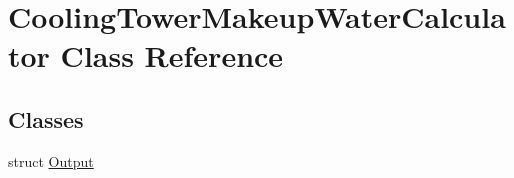 \hypertarget{class_cooling_tower_makeup_water_calculator}{}\section{Cooling\+Tower\+Makeup\+Water\+Calculator Class Reference}
\label{class_cooling_tower_makeup_water_calculator}
\subsection*{Classes}
\begin{DoxyCompactItemize}
\item 
struct \hyperlink{struct_cooling_tower_makeup_water_calculator_1_1_output}{Output}
\end{DoxyCompactItemize}
